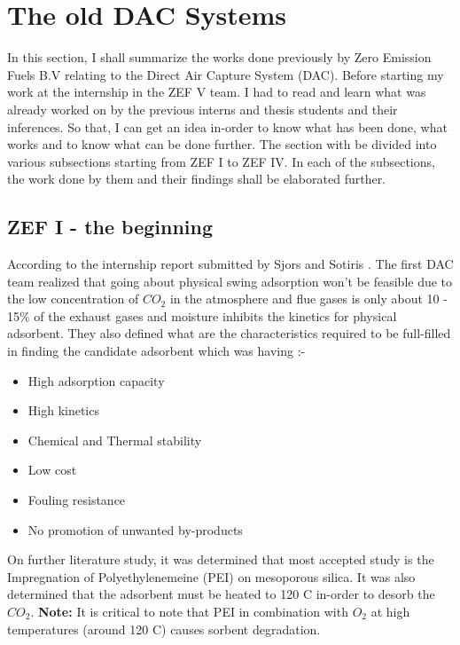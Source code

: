 \section{The old DAC Systems}
\label{sec:prework}

In this section, I shall summarize the works done previously by Zero Emission Fuels B.V relating to the Direct Air Capture System (DAC). Before starting my work at the internship in the ZEF V team. I had to read and learn what was already worked on by the previous interns and thesis students and their inferences. So that, I can get an idea in-order to know what has been done, what works and to know what can be done further. The section with be divided into various subsections starting from ZEF I to ZEF IV. In each of the subsections, the work done by them and their findings shall be elaborated further. 

\subsection{ZEF I - the beginning}

According to the internship report submitted by Sjors and Sotiris \cite{Wagenaar2018}. The first DAC team realized that going about physical swing adsorption won't be feasible due to the low concentration of $CO_2$ in the atmosphere and flue gases is only about 10 - 15\% of the exhaust gases and moisture inhibits the kinetics for physical adsorbent. They also defined what are the characteristics required to be full-filled in finding the candidate adsorbent which was having :-

\begin{itemize}
    \item High adsorption capacity
    \item High kinetics 
    \item Chemical and Thermal stability
    \item Low cost 
    \item Fouling resistance 
    \item No promotion of unwanted by-products
\end{itemize}

On further literature study, it was determined that most accepted study is the Impregnation of Polyethylenemeine (PEI) on mesoporous silica. It was also determined that the adsorbent must be heated to 120 \degree C  in-order to desorb the $CO_2$. \textbf{Note:} It is critical to note that PEI in combination with $O_2$ at high temperatures (around 120 \degree C) causes sorbent degradation. 

